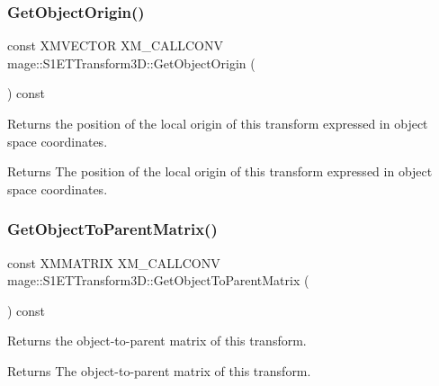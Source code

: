 \subsubsection{\texorpdfstring{Get\+Object\+Origin()}{GetObjectOrigin()}}
{\footnotesize\ttfamily const X\+M\+V\+E\+C\+T\+OR X\+M\+\_\+\+C\+A\+L\+L\+C\+O\+NV mage\+::\+S1\+E\+T\+Transform3\+D\+::\+Get\+Object\+Origin (\begin{DoxyParamCaption}{ }\end{DoxyParamCaption}) const\hspace{0.3cm}{\ttfamily [noexcept]}}

Returns the position of the local origin of this transform expressed in object space coordinates.

\begin{DoxyReturn}{Returns}
The position of the local origin of this transform expressed in object space coordinates. 
\end{DoxyReturn}
\mbox{\label{classmage_1_1_s1_e_t_transform3_d_ab34d4777f3faf3c72935c3a176253ba9}} 
\subsubsection{\texorpdfstring{Get\+Object\+To\+Parent\+Matrix()}{GetObjectToParentMatrix()}}
{\footnotesize\ttfamily const X\+M\+M\+A\+T\+R\+IX X\+M\+\_\+\+C\+A\+L\+L\+C\+O\+NV mage\+::\+S1\+E\+T\+Transform3\+D\+::\+Get\+Object\+To\+Parent\+Matrix (\begin{DoxyParamCaption}{ }\end{DoxyParamCaption}) const\hspace{0.3cm}{\ttfamily [noexcept]}}

Returns the object-\/to-\/parent matrix of this transform.

\begin{DoxyReturn}{Returns}
The object-\/to-\/parent matrix of this transform. 
\end{DoxyReturn}
\mbox{\label{classmage_1_1_s1_e_t_transform3_d_ae79d748433cc98f46e4bc0442a862cab}} 

